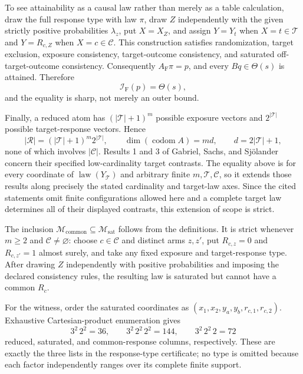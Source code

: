 To see attainability as a causal law rather than merely as a table calculation, draw the full response type with law \(\pi\), draw \(Z\) independently with the given strictly positive probabilities \(\lambda_z\), put \(X=X_Z\), and assign \(Y=Y_t\) when \(X=t\in\mathcal T\) and \(Y=R_{c,Z}\) when \(X=c\in\mathcal C\).  This construction satisfies randomization, target exclusion, exposure consistency, target-outcome consistency, and saturated off-target-outcome consistency.  Consequently \(A_{\mathrm F}\pi=p\), and every \(Bq\in\Theta(s)\) is attained.  Therefore
\[
\mathcal I_{\mathrm F}(p)=\Theta(s),
\]
and the equality is sharp, not merely an outer bound.

Finally, a reduced atom has \((|\mathcal T|+1)^m\) possible exposure vectors and \(2^{|\mathcal T|}\) possible target-response vectors.  Hence
\[
|\mathcal R|=(|\mathcal T|+1)^m2^{|\mathcal T|},
\qquad
\dim(\operatorname{codom}A)=md,
\qquad d=2|\mathcal T|+1,
\]
none of which involves \(|\mathcal C|\).  Results 1 and 3 of Gabriel, Sachs, and Sj\"olander \cite{GabrielSachsSjolander2025} concern their specified low-cardinality target contrasts.  The equality above is for every coordinate of \(\operatorname{law}(Y_{\mathcal T})\) and arbitrary finite \(m,\mathcal T,\mathcal C\), so it extends those results along precisely the stated cardinality and target-law axes.  Since the cited statements omit finite configurations allowed here and a complete target law determines all of their displayed contrasts, this extension of scope is strict.

The inclusion \(\mathcal M_{\mathrm{common}}\subseteq\mathcal M_{\mathrm{sat}}\) follows from the definitions.  It is strict whenever \(m\ge2\) and \(\mathcal C\ne\varnothing\): choose \(c\in\mathcal C\) and distinct arms \(z,z'\), put \(R_{c,z}=0\) and \(R_{c,z'}=1\) almost surely, and take any fixed exposure and target-response type.  After drawing \(Z\) independently with positive probabilities and imposing the declared consistency rules, the resulting law is saturated but cannot have a common \(R_c\).

For the witness, order the saturated coordinates as \((x_1,x_2,y_a,y_b,r_{c,1},r_{c,2})\).  Exhaustive Cartesian-product enumeration gives
\[
3^2\,2^2=36,
\qquad
3^2\,2^2\,2^2=144,
\qquad
3^2\,2^2\,2=72
\]
reduced, saturated, and common-response columns, respectively.  These are exactly the three lists in the response-type certificate; no type is omitted because each factor independently ranges over its complete finite support.

